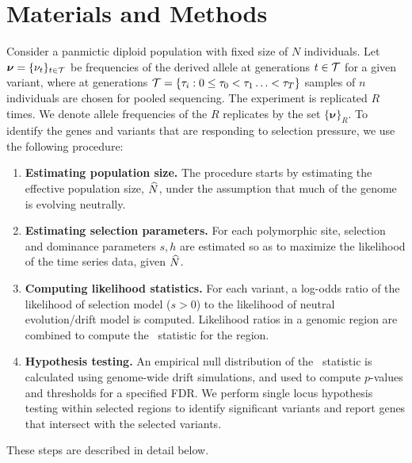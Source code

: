 \section{Materials and Methods}
\label{sec:method}
Consider a panmictic diploid population with fixed size of $N$
individuals.  Let $\bm{ \nu} =\{\nu_t\}_{t\in{\cal T}}$ be frequencies of
the derived allele at generations $t\in{\cal T}$ for a given variant, where
at generations ${\cal T}= \{\tau_i: 0\le \tau_0<\tau_1\ldots< \tau_T\}$
samples of $n$ individuals are chosen for pooled sequencing. The
experiment is replicated $R$ times. We denote allele frequencies of
the $R$ replicates by the set $\{\bm{\nu}\}_R$.  To identify the genes
and variants that are responding to selection pressure, we use the
following procedure:
\begin{enumerate}
\item {\bf Estimating population size.} The procedure starts by
  estimating the effective population size, $\widehat{N}$, under the
  assumption that much of the genome is evolving neutrally.
\item {\bf Estimating selection parameters.} For each polymorphic
  site, selection and dominance parameters $s,h$ are estimated so
  as to maximize the likelihood of the time series data, given $\widehat{N}$.
\item {\bf Computing likelihood statistics.} For each variant, a
  log-odds ratio of the likelihood of selection model ($s>0$) to the
  likelihood of neutral evolution/drift model is computed. Likelihood
  ratios in a genomic region are combined to compute the \comale\
  statistic for the region.
\item {\bf Hypothesis testing.} An empirical null distribution of the
  \comale\ statistic is calculated using genome-wide drift
  simulations, and used to compute $p$-values and thresholds for a
  specified FDR. We perform single locus hypothesis testing within
  selected regions to identify significant variants and report genes
  that intersect with the selected variants.
\end{enumerate}
These steps are described in detail below.

